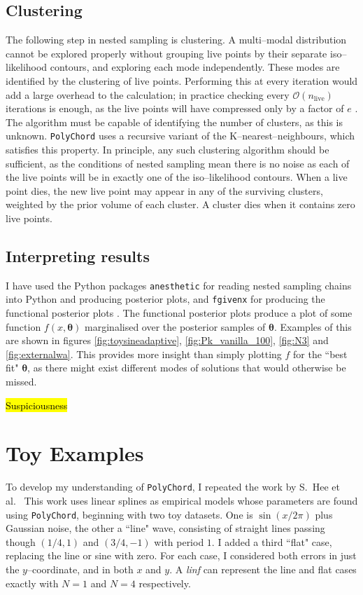 \documentclass{article}
\begin{document}
\subsection{Clustering}

The following step in nested sampling is clustering. A multi--modal distribution cannot be explored properly without grouping live points by their separate iso--likelihood contours, and exploring each mode independently. These modes are identified by the clustering of live points. Performing this at every iteration would add a large overhead to the calculation; in practice checking every $\mathcal{O}(n_\textrm{live})$ iterations is enough, as the live points will have compressed only by a factor of $e$ \cite{PolyChord_1}. The algorithm must be capable of identifying the number of clusters, as this is unknown. \texttt{PolyChord} uses a recursive variant of the K--nearest--neighbours, which satisfies this property. In principle, any such clustering algorithm should be sufficient, as the conditions of nested sampling mean there is no noise as each of the live points will be in exactly one of the iso--likelihood contours. When a live point dies, the new live point may appear in any of the surviving clusters, weighted by the prior volume of each cluster. A cluster dies when it contains zero live points.

\subsection{Interpreting results}

I have used the Python packages \texttt{anesthetic} for reading nested sampling chains into Python and producing posterior plots, and \texttt{fgivenx} for producing the functional posterior plots \cite{anesthetic, fgivenx}. The functional posterior plots produce a plot of some function $f(x, \bm\theta)$ marginalised over the posterior samples of $\bm\theta$. Examples of this are shown in figures \ref{fig:toysineadaptive}, 
\ref{fig:Pk_vanilla_100}, \ref{fig:N3} and \ref{fig:externalwa}. This provides more insight than simply plotting $f$ for the ``best fit" $\bm\theta$, as there might exist different modes of solutions that would otherwise be missed.

\hl{Suspiciousness}

\section{Toy Examples}
\label{toyexamples}
To develop my understanding of \texttt{PolyChord}, I repeated the work by S.~Hee et al.\ \cite{Sonke} This work uses linear splines as empirical models whose parameters are found using \texttt{PolyChord}, beginning with two toy datasets. One is $\sin\left({x/2\pi}\right)$ plus Gaussian noise, the other a ``line" wave, consisting of straight lines passing though $(1/4, 1)$ and $(3/4, -1)$ with period $1$. I added a third ``flat" case, replacing the line or sine with zero. For each case, I considered both errors in just the $y$--coordinate, and in both $x$ and $y$. A \textit{linf} can represent the line and flat cases exactly with $N=1$ and $N=4$ respectively.
\end{document}
